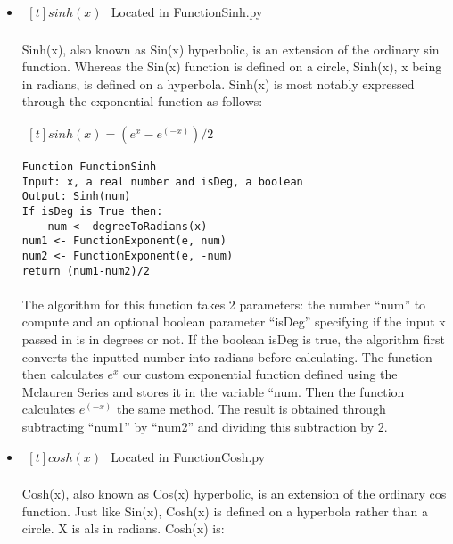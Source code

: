 \begin{itemize}
        \item $\begin{aligned}[t]
            sinh(x)
        \end{aligned}$
            Located in FunctionSinh.py

            \paragraph{}
            Sinh(x), also known as Sin(x) hyperbolic, is an extension of the ordinary sin function. Whereas the Sin(x) function is defined on a circle, Sinh(x), x being in radians, is defined on a hyperbola. Sinh(x) is most notably expressed through the exponential function as follows:

            $\begin{aligned}[t]
                sinh(x) = (e^x - e^(-x))/2
            \end{aligned}$

            \begin{lstlisting}
Function FunctionSinh
Input: x, a real number and isDeg, a boolean
Output: Sinh(num)
If isDeg is True then:
    num <- degreeToRadians(x)
num1 <- FunctionExponent(e, num)
num2 <- FunctionExponent(e, -num)
return (num1-num2)/2
            \end{lstlisting}

            \paragraph{}
            The algorithm for this function takes 2 parameters: the number “num” to compute and an optional boolean parameter “isDeg” specifying if the input x passed in is in degrees or not. If the boolean isDeg is true, the algorithm first converts the inputted number into radians before calculating. The function then calculates $e^x$ our custom exponential function defined using the Mclauren Series and stores it in the variable “num. Then the function calculates $e^(-x)$ the same method. The result is obtained through subtracting “num1” by “num2” and dividing this subtraction by 2.

        \item $\begin{aligned}[t]
            cosh(x)
        \end{aligned}$
            Located in FunctionCosh.py

            \paragraph{}
            Cosh(x), also known as Cos(x) hyperbolic, is an extension of the ordinary cos function. Just like Sin(x), Cosh(x) is defined on a hyperbola rather than a circle. X is als   in radians. Cosh(x) is:


\end{itemize}
